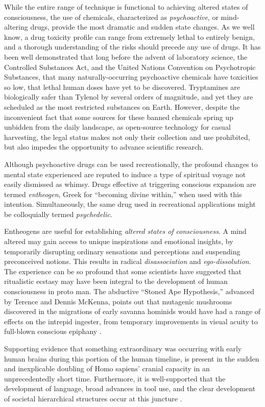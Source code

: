\documentclass{UIdahoMastersThesis}
\begin{document}
While the entire range of technique is functional to achieving altered states of consciousness, the use of chemicals, characterized as \textit{psychoactive}, or mind-altering drugs, provide the most dramatic and sudden state changes. As we well know, a drug toxicity profile can range from extremely lethal to entirely benign, and a thorough understanding of the risks should precede any use of drugs. It has been well demonstrated that long before the advent of laboratory science, the Controlled Substances Act, and the United Nations Convention on Psychotropic Substances, that many naturally-occurring psychoactive chemicals have toxicities so low, that lethal human doses have yet to be discovered. Tryptamines are biologically safer than Tylenol by several orders of magnitude, and yet they are scheduled as the most restricted substances on Earth. However, despite the inconvenient fact that some sources for these banned chemicals spring up unbidden from the daily landscape, as open-source technology for casual harvesting, the legal status makes not only their collection and use prohibited, but also impedes the opportunity to advance scientific research.

Although psychoactive drugs can be used recreationally, the profound changes to mental state experienced are reputed to induce a type of spiritual voyage not easily dismissed as whimsy. Drugs effective at triggering conscious expansion are termed \textit{entheogen}, Greek for ``becoming divine within,'' when used with this intention. Simultaneously, the same drug used in recreational applications might be colloquially termed \textit{psychedelic}.

Entheogens are useful for establishing \textit{altered states of consciousness}. A mind altered may gain access to unique inspirations and emotional insights, by temporarily disrupting ordinary sensations and perceptions and suspending preconceived notions. This results in radical \textit{disassociation} and \textit{ego-dissolution}. The experience can be so profound that some scientists have suggested that ritualistic ecstasy may have been integral to the development of human consciousness in proto man. The abductive ``Stoned Ape Hypothesis,'' advanced by Terence and Dennis McKenna, points out that mutagenic mushrooms discovered in the migrations of early savanna hominids would have had a range of effects on the intrepid ingester, from temporary improvements in visual acuity to full-blown conscious epiphany \cite{mckenna_invisible_1993}.

Supporting evidence that something extraordinary was occurring with early human brains during this portion of the human timeline, is present in the sudden and inexplicable doubling of Homo sapiens' cranial capacity in an unprecedentedly short time. Furthermore, it is well-supported that the development of language, broad advances in tool use, and the clear development of societal hierarchical structures occur at this juncture \cite{mckenna_food_1992}.
\end{document}

